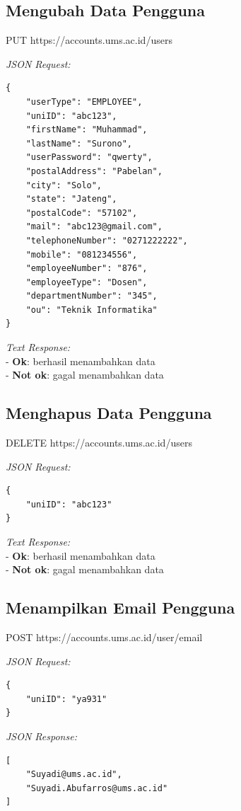 \subsection{Mengubah Data Pengguna}

PUT https://accounts.ums.ac.id/users

\noindent
\textit{JSON Request:}
\begin{lstlisting}
{
    "userType": "EMPLOYEE",
    "uniID": "abc123",
    "firstName": "Muhammad",
    "lastName": "Surono",
    "userPassword": "qwerty",
    "postalAddress": "Pabelan",
    "city": "Solo",
    "state": "Jateng",
    "postalCode": "57102",
    "mail": "abc123@gmail.com",
    "telephoneNumber": "0271222222",
    "mobile": "081234556",
    "employeeNumber": "876",
    "employeeType": "Dosen",
    "departmentNumber": "345",
    "ou": "Teknik Informatika"
}
\end{lstlisting}

\noindent
\textit{Text Response:}\\
- \textbf{Ok}: berhasil menambahkan data\\
-  \textbf{Not ok}: gagal menambahkan data

\subsection{Menghapus Data Pengguna}

DELETE https://accounts.ums.ac.id/users

\noindent
\textit{JSON Request:}
\begin{lstlisting}
{
    "uniID": "abc123"
}
\end{lstlisting}

\noindent
\textit{Text Response:}\\
- \textbf{Ok}: berhasil menambahkan data\\
-  \textbf{Not ok}: gagal menambahkan data


\subsection{Menampilkan Email Pengguna}

POST https://accounts.ums.ac.id/user/email

\noindent
\textit{JSON Request:}
\begin{lstlisting}
{
    "uniID": "ya931"
}
\end{lstlisting}

\noindent
\textit{JSON Response:}
\begin{lstlisting}
[
    "Suyadi@ums.ac.id",
    "Suyadi.Abufarros@ums.ac.id"
]
\end{lstlisting}

